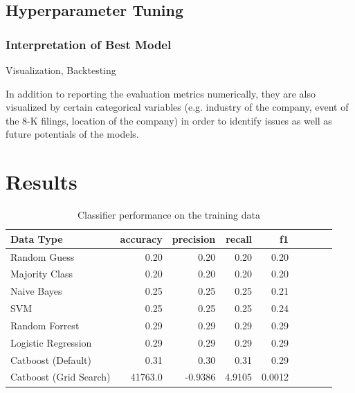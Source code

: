 \documentclass{article}
\begin{document}
	
	\subsection{Hyperparameter Tuning}
	
	
	\subsubsection{Interpretation of Best Model}
	
	Visualization, Backtesting
	
	In addition to reporting the evaluation metrics numerically, they are also visualized by certain categorical variables (e.g. industry of the company, event of the 8-K filings, location of the company) in order to identify issues as well as future potentials of the models. 
	
	\section{Results}


	\begin{table}[h!]
		\centering
		\caption{Classifier performance on the training data}
		\label{table:results_valid}
		
		\begin{tabular}{lrrrrrrrr}
			\toprule
			Data Type &     accuracy &     precision &     recall &    f1 \\
			\midrule
			Random Guess   &  0.20 &  0.20 &   0.20 &  0.20 \\
			Majority Class &    0.20 &  0.20 &   0.20 &   0.20 \\
			Naive Bayes       &   0.25 & 0.25 &  0.25 &  0.21 \\
			SVM      &   0.25 & 0.25 &  0.25 &  0.24 \\
			Random Forrest      &  0.29 & 0.29 & 0.29 &  0.29 \\
			Logistic Regression   &  0.29 & 0.29 &  0.29 &  0.29 \\
			Catboost (Default)   &  0.31 & 0.30 &  0.31 & 0.29 \\
			Catboost (Grid Search)   &  41763.0 & -0.9386 &  4.9105 &  0.0012 \\
			\bottomrule
		\end{tabular}
		
	\end{table}%
\end{document}
